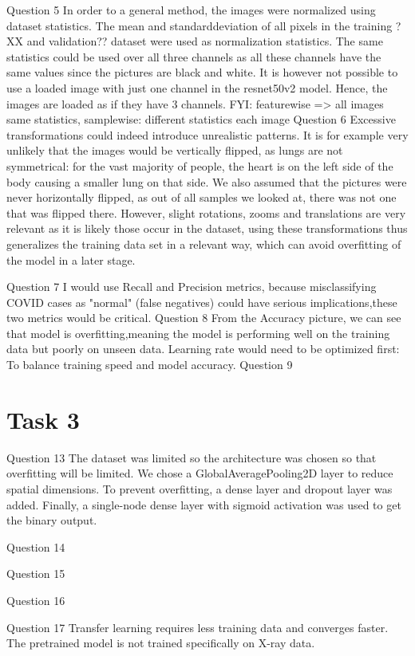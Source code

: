 \documentclass[conference]{IEEEtran}
\begin{document}
Question 5
In order to a general method, the images were normalized using dataset statistics. The mean and standarddeviation of all pixels in the training ?XX and validation?? dataset were used as normalization statistics. 
The same statistics could be used over all three channels as all these channels have the same values since the pictures are black and white. It is however not possible to use a loaded image with just one channel in the resnet50v2 model. Hence, the images are loaded as if they have 3 channels.
FYI: featurewise => all images same statistics, samplewise: different statistics each image
Question 6
Excessive transformations could indeed introduce unrealistic patterns. It is for example very unlikely that the images would be vertically flipped, as lungs are not symmetrical: for the vast majority of people, the heart is on the left side of the body causing a smaller lung on that side. 
We also assumed that the pictures were never horizontally flipped, as out of all samples we looked at, there was not one that was flipped there. However, slight rotations, zooms and translations are very relevant as it is likely those occur in the dataset, using these transformations thus generalizes the training data set in a relevant way, which can avoid overfitting of the model in a later stage.

Question 7
I would use Recall and Precision metrics, because misclassifying COVID cases as "normal" (false negatives) could have serious implications,these two metrics would be critical.
Question 8
From the Accuracy picture, we can see that model is overfitting,meaning the model is performing well on the training data but poorly on unseen data. Learning rate would need to be optimized first: To balance training speed and model accuracy.
Question 9


\section{Task 3}
Question 13
The dataset was limited so the architecture was chosen so that overfitting will be limited. We chose a GlobalAveragePooling2D layer to reduce spatial dimensions.
To prevent overfitting, a dense layer and dropout layer was added. Finally, a single-node dense layer with sigmoid activation was used to get the binary output.

Question 14

Question 15

Question 16

Question 17
Transfer learning requires less training data and converges faster. 
The pretrained model is not trained specifically on X-ray data.
\end{document}
